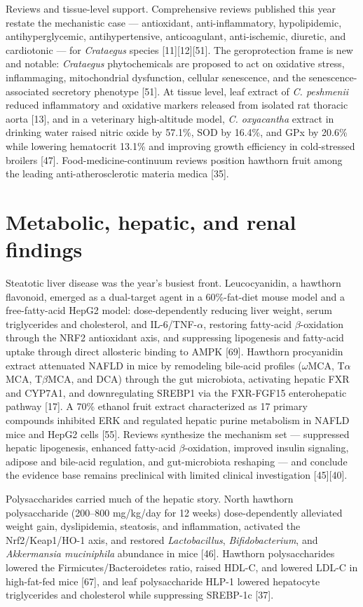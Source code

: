 \documentclass[11pt]{article}
\begin{document}
Reviews and tissue-level support. Comprehensive reviews published this year restate the mechanistic case --- antioxidant, anti-inflammatory, hypolipidemic, antihyperglycemic, antihypertensive, anticoagulant, anti-ischemic, diuretic, and cardiotonic --- for \emph{Crataegus} species [11][12][51]. The geroprotection frame is new and notable: \emph{Crataegus} phytochemicals are proposed to act on oxidative stress, inflammaging, mitochondrial dysfunction, cellular senescence, and the senescence-associated secretory phenotype [51]. At tissue level, leaf extract of \emph{C. peshmenii} reduced inflammatory and oxidative markers released from isolated rat thoracic aorta [13], and in a veterinary high-altitude model, \emph{C. oxyacantha} extract in drinking water raised nitric oxide by 57.1\%, SOD by 16.4\%, and GPx by 20.6\% while lowering hematocrit 13.1\% and improving growth efficiency in cold-stressed broilers [47]. Food-medicine-continuum reviews position hawthorn fruit among the leading anti-atherosclerotic materia medica [35].

\section*{Metabolic, hepatic, and renal findings}
Steatotic liver disease was the year's busiest front. Leucocyanidin, a hawthorn flavonoid, emerged as a dual-target agent in a 60\%-fat-diet mouse model and a free-fatty-acid HepG2 model: dose-dependently reducing liver weight, serum triglycerides and cholesterol, and IL-6/TNF-$\alpha$, restoring fatty-acid $\beta$-oxidation through the NRF2 antioxidant axis, and suppressing lipogenesis and fatty-acid uptake through direct allosteric binding to AMPK [69]. Hawthorn procyanidin extract attenuated NAFLD in mice by remodeling bile-acid profiles ($\omega$MCA, T$\alpha$MCA, T$\beta$MCA, and DCA) through the gut microbiota, activating hepatic FXR and CYP7A1, and downregulating SREBP1 via the FXR-FGF15 enterohepatic pathway [17]. A 70\% ethanol fruit extract characterized as 17 primary compounds inhibited ERK and regulated hepatic purine metabolism in NAFLD mice and HepG2 cells [55]. Reviews synthesize the mechanism set --- suppressed hepatic lipogenesis, enhanced fatty-acid $\beta$-oxidation, improved insulin signaling, adipose and bile-acid regulation, and gut-microbiota reshaping --- and conclude the evidence base remains preclinical with limited clinical investigation [45][40].

Polysaccharides carried much of the hepatic story. North hawthorn polysaccharide (200--800 mg/kg/day for 12 weeks) dose-dependently alleviated weight gain, dyslipidemia, steatosis, and inflammation, activated the Nrf2/Keap1/HO-1 axis, and restored \emph{Lactobacillus}, \emph{Bifidobacterium}, and \emph{Akkermansia muciniphila} abundance in mice [46]. Hawthorn polysaccharides lowered the Firmicutes/Bacteroidetes ratio, raised HDL-C, and lowered LDL-C in high-fat-fed mice [67], and leaf polysaccharide HLP-1 lowered hepatocyte triglycerides and cholesterol while suppressing SREBP-1c [37].
\end{document}
